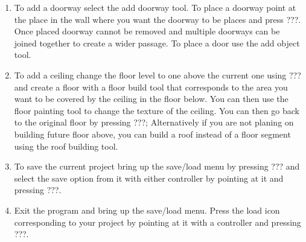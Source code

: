 \begin{enumerate}
    \item To add a doorway select the add doorway tool. To place a doorway point at the place in the wall where you want the doorway to be places and press ???. Once placed doorway cannot be removed and multiple doorways can be joined together to create a wider passage. To place a door use the add object tool.
    \item To add a ceiling change the floor level to one above the current one using ??? and create a floor with a floor build tool that corresponds to the area you want to be covered by the ceiling in the floor below. You can then use the floor painting tool to change the texture of the ceiling. You can then go back to the original floor by pressing ???; Alternatively if you are not planing on building future floor above, you can build a roof instead of a floor segment using the roof building tool.
    \item To save the current project bring up the save/load menu by pressing ??? and select the save option from it with either controller by pointing at it and pressing ???.
    \item Exit the program and bring up the save/load menu. Press the load icon corresponding to your project by pointing at it with a controller and pressing ???.
\end{enumerate}